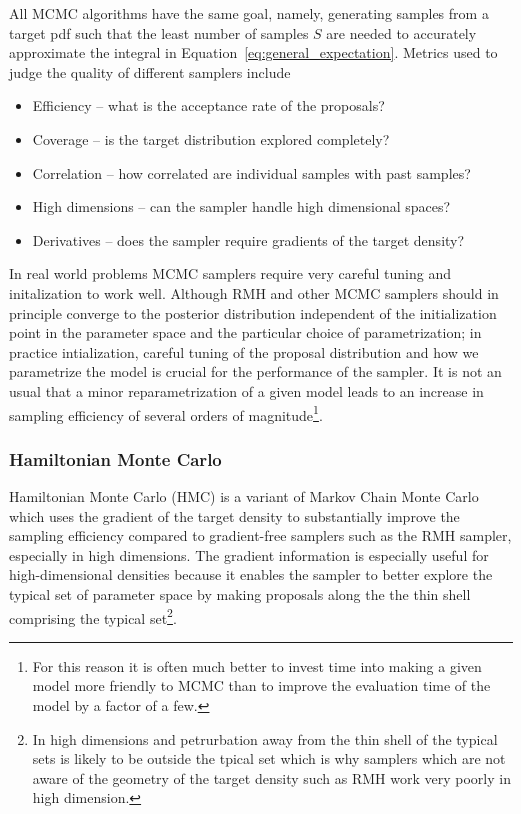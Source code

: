 \documentclass[12pt,dvipsnames]{report}
\begin{document}
All MCMC algorithms have the same goal, namely, generating samples from a
target pdf such that the least number of samples $S$ are needed to accurately
approximate the integral in Equation~\ref{eq:general_expectation}. Metrics
used to judge the quality of different samplers include 
\begin{itemize}
    \item Efficiency -- what is the acceptance rate of the proposals?
    \item Coverage -- is the target distribution explored completely?
    \item Correlation -- how correlated are individual samples with past samples?
    \item High dimensions -- can the sampler handle high dimensional spaces?
    \item Derivatives -- does the sampler require gradients of the target density? 
\end{itemize}
In real world problems MCMC samplers require very careful tuning and initalization 
to work well. Although RMH and other MCMC samplers should in principle converge to the posterior distribution 
independent of the initialization point in the parameter space and the particular 
choice of parametrization; in practice intialization, careful tuning of the proposal 
distribution and how we parametrize the model is crucial for the performance 
of the sampler. It is not an usual that a minor reparametrization of a given model leads 
to an increase in sampling efficiency of several orders of magnitude\footnote{For this
reason it is often much better to invest time into making a given model more friendly 
to MCMC than to improve the evaluation time of the model by a factor of a few.}.


\subsubsection{Hamiltonian Monte Carlo}
Hamiltonian Monte Carlo (HMC) \citep{1987PhLB..195..216D,arXiv:1206.1901} is a 
variant of  Markov Chain Monte Carlo which uses the gradient of the target 
density to substantially  improve the sampling efficiency compared to 
gradient-free samplers such as the RMH sampler, especially in high dimensions.
The gradient information is especially useful for high-dimensional densities 
because it enables the sampler to better 
explore the typical set of parameter space by making proposals along the 
the thin shell comprising the typical set\footnote{In high dimensions and 
petrurbation away from the thin shell of the typical sets is likely to be 
outside the tpical set which is why samplers which are not aware of the 
geometry of the target density such as RMH work very poorly in high dimension.}.
\end{document}
